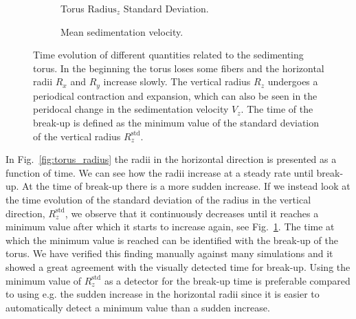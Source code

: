 \begin{figure}[!htbp]
\begin{subfigure}[h]{.48\textwidth}
    \caption{Torus $\text{Radius}_z$ Standard Deviation.}\label{fig:torus_deviation}
  \end{subfigure}
  \begin{subfigure}[h]{.48\textwidth}
    \caption{Mean sedimentation velocity.}\label{fig:torus_velocity}
  \end{subfigure}
  \caption[Time evolution of the sedimenting torus.]{Time evolution of different quantities related to the sedimenting torus. In the beginning the torus loses some fibers and the horizontal radii $R_x$ and $R_y$ increase slowly. The vertical radius $R_z$ undergoes a periodical contraction and expansion, which can also be seen in the peridocal change in the sedimentation velocity $V_z$. The time of the break-up is defined as the minimum value of the standard deviation of the vertical radius $R_z^{\text{std}}$.}
  \label{fig:torus}
\end{figure}

In Fig.~\ref{fig:torus_radius} the radii in the horizontal direction is presented as a function of time. We can see how the radii increase at a steady rate until break-up. At the time of break-up there is a more sudden increase. If we instead look at the time evolution of the standard deviation of the radius in the vertical direction, $R_z^{\text{std}}$, we observe that it continuously decreases until it reaches a minimum value after which it starts to increase again, see Fig.~\ref{fig:torus_deviation}. The time at which the minimum value is reached can be identified with the break-up of the torus. We have verified this finding manually against many simulations and it showed a great agreement with the visually detected time for break-up. Using the minimum value of $R_z^{\text{std}}$ as a detector for the break-up time is preferable compared to using e.g. the sudden increase in the horizontal radii since it is easier to automatically detect a minimum value than a sudden increase.

